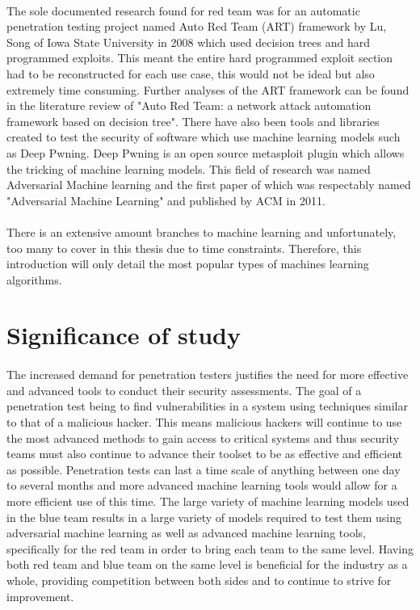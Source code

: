 \paragraph{}The sole documented research found for red team was for an automatic penetration testing project named Auto Red Team (ART) framework by Lu, Song of Iowa State University in 2008 which used decision trees and hard programmed exploits. This meant the entire hard programmed exploit section had to be reconstructed for each use case, this would not be ideal but also extremely time consuming. Further analyses of the ART framework can be found in the literature review of "Auto Red Team: a network attack automation framework based on decision tree". There have also been tools and libraries created to test the security of software which use machine learning models such as Deep Pwning. Deep Pwning is an open source metasploit plugin which allows the tricking of machine learning models. This field of research was named Adversarial Machine learning and the first paper of which was respectably named "Adversarial Machine Learning" and published by ACM in 2011.
\paragraph{}There is an extensive amount branches to machine learning and unfortunately, too many to cover in this thesis due to time constraints. Therefore, this introduction will only detail the most popular types of machines learning algorithms.


\section{Significance of study}
\label{sec:section3}

\paragraph{}The increased demand for penetration testers justifies the need for more effective and advanced tools to conduct their security assessments. The goal of a penetration test being to find vulnerabilities in a system using techniques similar to that of a malicious hacker. This means malicious hackers will continue to use the most advanced methods to gain access to critical systems and thus security teams must also continue to advance their toolset to be as effective and efficient as possible. Penetration tests can last a time scale of anything between one day to several months and more advanced machine learning tools would allow for a more efficient use of this time. The large variety of machine learning models used in the blue team results in a large variety of models required to test them using adversarial machine learning as well as advanced machine learning tools, specifically for the red team in order to bring each team to the same level. Having both red team and blue team on the same level is beneficial for the industry as a whole, providing competition between both sides and to continue to strive for improvement.

